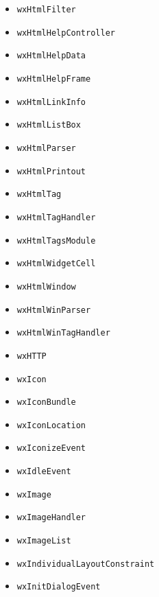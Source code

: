 \documentclass[a4paper,11pt,oneside,titlepage]{report}
\begin{document}
\begin{itemize}
\item \texttt{wxHtmlFilter}
\item \texttt{wxHtmlHelpController}
\item \texttt{wxHtmlHelpData}
\item \texttt{wxHtmlHelpFrame}
\item \texttt{wxHtmlLinkInfo}
\item \texttt{wxHtmlListBox}
\item \texttt{wxHtmlParser}
\item \texttt{wxHtmlPrintout}
\item \texttt{wxHtmlTag}
\item \texttt{wxHtmlTagHandler}
\item \texttt{wxHtmlTagsModule}
\item \texttt{wxHtmlWidgetCell}
\item \texttt{wxHtmlWindow}
\item \texttt{wxHtmlWinParser}
\item \texttt{wxHtmlWinTagHandler}
\item \texttt{wxHTTP}
\item \texttt{wxIcon}
\item \texttt{wxIconBundle}
\item \texttt{wxIconLocation}
\item \texttt{wxIconizeEvent}
\item \texttt{wxIdleEvent}
\item \texttt{wxImage}
\item \texttt{wxImageHandler}
\item \texttt{wxImageList}
\item \texttt{wxIndividualLayoutConstraint}
\item \texttt{wxInitDialogEvent}


\end{itemize}
\end{document}
